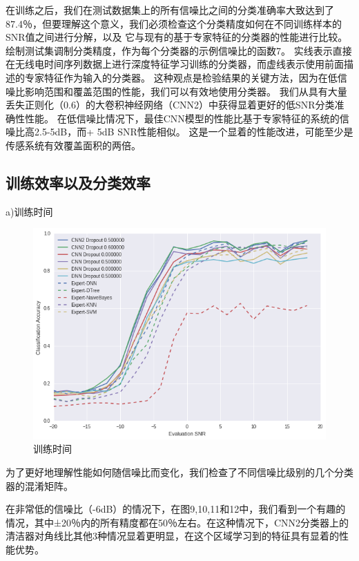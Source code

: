 在训练之后，我们在测试数据集上的所有信噪比之间的分类准确率大致达到了87.4％，但要理解这个意义，我们必须检查这个分类精度如何在不同训练样本的SNR值之间进行分解，以及 它与现有的基于专家特征的分类器的性能进行比较。绘制测试集调制分类精度，作为每个分类器的示例信噪比的函数7。 实线表示直接在无线电时间序列数据上进行深度特征学习训练的分类器，而虚线表示使用前面描述的专家特征作为输入的分类器。 这种观点是检验结果的关键方法，因为在低信噪比影响范围和覆盖范围的性能，我们可以有效地使用分类器。 我们从具有大量丢失正则化（0.6）的大卷积神经网络（CNN2）中获得显着更好的低SNR分类准确性性能。 在低信噪比情况下，最佳CNN模型的性能比基于专家特征的系统的信噪比高2.5-5dB，而+ 5dB SNR性能相似。 这是一个显着的性能改进，可能至少是传感系统有效覆盖面积的两倍。\par


\subsection{训练效率以及分类效率}

a)训练时间
\begin{figure}[!h]
	\centering
	\includegraphics[scale=0.3]{figures/chapter_3/result}
	\caption{训练时间}	\label{sec:fig_3_12}
\end{figure}

为了更好地理解性能如何随信噪比而变化，我们检查了不同信噪比级别的几个分类器的混淆矩阵。\par

在非常低的信噪比（-6dB）的情况下，在图9,10,11和12中，我们看到一个有趣的情况，其中±20％内的所有精度都在50％左右。在这种情况下，CNN2分类器上的清洁器对角线比其他3种情况显着更明显，在这个区域学习到的特征具有显着的性能优势。\par


